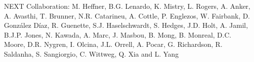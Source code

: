 NEXT Collaboration: M. Heffner, B.G. Lenardo, K. Mistry, L. Rogers, A. Anker, A. Avasthi, T. Brunner, N.R. Catarineu, A. Cottle, P. Englezos, W. Fairbank, D. González Díaz, R. Guenette, S.J. Haselschwardt, S. Hedges, J.D. Holt, A. Jamil, B.J.P. Jones, N. Kawada, A. Marc, J. Masbou, B. Mong, B. Monreal, D.C. Moore, D.R. Nygren, I. Olcina, J.L. Orrell, A. Pocar, G. Richardson, R. Saldanha, S. Sangiorgio, C. Wittweg, Q. Xia and L. Yang